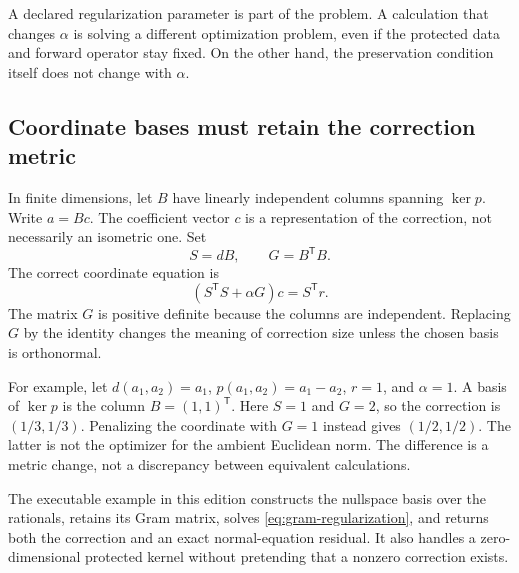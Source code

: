 A declared regularization parameter is part of the problem. A calculation that changes $\alpha$ is solving a different optimization problem, even if the protected data and forward operator stay fixed. On the other hand, the preservation condition itself does not change with $\alpha$.

\subsection{Coordinate bases must retain the correction metric}
In finite dimensions, let $B$ have linearly independent columns spanning $\ker p$. Write $a=Bc$. The coefficient vector $c$ is a representation of the correction, not necessarily an isometric one. Set
\[
 S=dB,\qquad G=B^{\mathsf T}B.
\]
The correct coordinate equation is
\begin{equation}\label{eq:gram-regularization}
 (S^{\mathsf T}S+\alpha G)c=S^{\mathsf T}r.
\end{equation}
The matrix $G$ is positive definite because the columns are independent. Replacing $G$ by the identity changes the meaning of correction size unless the chosen basis is orthonormal.

For example, let $d(a_1,a_2)=a_1$, $p(a_1,a_2)=a_1-a_2$, $r=1$, and $\alpha=1$. A basis of $\ker p$ is the column $B=(1,1)^{\mathsf T}$. Here $S=1$ and $G=2$, so the correction is $(1/3,1/3)$. Penalizing the coordinate with $G=1$ instead gives $(1/2,1/2)$. The latter is not the optimizer for the ambient Euclidean norm. The difference is a metric change, not a discrepancy between equivalent calculations.

The executable example in this edition constructs the nullspace basis over the rationals, retains its Gram matrix, solves \eqref{eq:gram-regularization}, and returns both the correction and an exact normal-equation residual. It also handles a zero-dimensional protected kernel without pretending that a nonzero correction exists.

